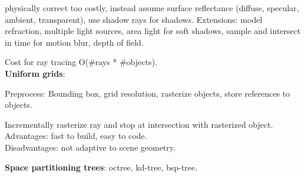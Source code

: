  physically correct too costly, instead assume surface reflectance (diffuse, specular, ambient, transparent), use shadow rays for shadows. Extensions: model refraction,  multiple light sources, area light for soft shadows, sample and intersect in time for motion blur, depth of field.

 Cost for ray tracing O(\#rays * \#objects). \\
\textbf{Uniform grids}:
\begin{compactitem}
    \item Preprocess: Bounding box, grid resolution, rasterize objects, store references to objects. 
    \item Incrementally rasterize ray and stop at intersection with rasterized object. \\Advantages: fast to build, easy to code. 
    \\Disadvantages: not adaptive to scene geometry.
\end{compactitem}
\textbf{Space partitioning trees}: octree, kd-tree, bsp-tree.
